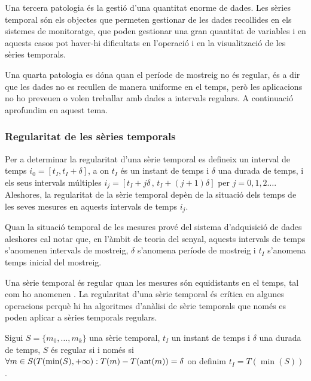 Una tercera patologia és la gestió d’una quantitat enorme de dades.
Les sèries temporal són els objectes que permeten gestionar de les
dades recollides en els sistemes de monitoratge, que poden gestionar
una gran quantitat de variables i en aquests casos pot haver-hi
dificultats en l'operació i en la visualització de les sèries
temporals.


Una quarta patologia es dóna quan el període de mostreig no és
regular, és a dir que les dades no es recullen de manera uniforme en
el temps, però les aplicacions no ho preveuen o volen treballar amb
dades a intervals regulars. A continuació aprofundim en aquest tema.






\subsubsection{Regularitat de les sèries temporals} 


Per a determinar la regularitat d'una sèrie temporal es defineix un
interval de temps $i_0=[t_I,t_I+\delta]$, a on $t_I$ és un instant de
temps i $\delta$ una durada de temps, i els seus intervals múltiples
$i_j=[t_I+j\delta\, ,\, t_I+(j+1)\delta]$ per
$j=0,1,2\ldots$. Aleshores, la regularitat de la sèrie temporal depèn
de la situació dels temps de les seves mesures en aquests intervals de
temps $i_j$.
 
Quan la situació temporal de les mesures prové del sistema
d'adquisició de dades aleshores cal notar que, en l'àmbit de
teoria del senyal, aquests intervals de temps s'anomenen intervals de
mostreig, $\delta$ s'anomena període de mostreig i $t_I$ s'anomena
temps inicial del mostreig.


Una sèrie temporal és regular quan les mesures són equidistants en el
temps, tal com ho anomenen \textcite{last:hetland}.  La regularitat
d'una sèrie temporal és crítica en algunes operacions perquè hi ha
algoritmes d'anàlisi de sèrie temporals que només es poden aplicar a
sèries temporals regulars.
\begin{definition}
  \label{def:st:regular}
  Sigui $S=\{m_0,\ldots,m_k\}$ una sèrie temporal, $t_I$ un instant de
  temps i $\delta$ una durada de temps, $S$ és regular si i
  només si $\forall m \in S(T(\min(S),+\infty):T(m) - T(\operatorname*{ant}(m)) =
  \delta$ on definim $t_I=T(\min(S))$.
\end{definition}

